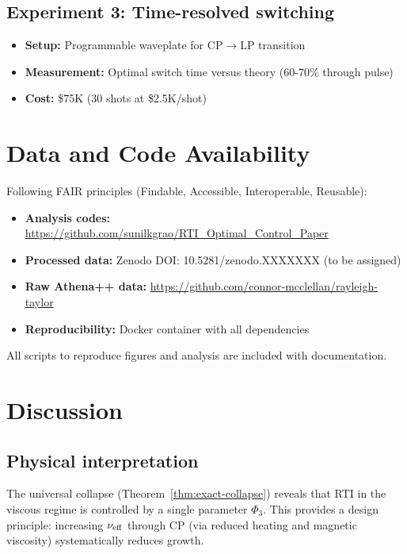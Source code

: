 \documentclass[aps,pre,twocolumn,showpacs,superscriptaddress]{revtex4-2}
\theoremstyle{definition}
\begin{document}
\subsection{Experiment 3: Time-resolved switching}
\begin{itemize}
\item \textbf{Setup:} Programmable waveplate for CP$\to$LP transition
\item \textbf{Measurement:} Optimal switch time versus theory (60-70\% through pulse)
\item \textbf{Cost:} \$75K (30 shots at \$2.5K/shot)
\end{itemize}

\section{Data and Code Availability}\label{sec:data}

Following FAIR principles (Findable, Accessible, Interoperable, Reusable):

\begin{itemize}
\item \textbf{Analysis codes:} \url{https://github.com/sunilkgrao/RTI_Optimal_Control_Paper}
\item \textbf{Processed data:} Zenodo DOI: 10.5281/zenodo.XXXXXXX (to be assigned)
\item \textbf{Raw Athena++ data:} \url{https://github.com/connor-mcclellan/rayleigh-taylor}
\item \textbf{Reproducibility:} Docker container with all dependencies
\end{itemize}

All scripts to reproduce figures and analysis are included with documentation.

\section{Discussion}\label{sec:discussion}

\subsection{Physical interpretation}

The universal collapse (Theorem~\ref{thm:exact-collapse}) reveals that RTI in the viscous regime is controlled by a single parameter $\Phi_3$. This provides a design principle: increasing $\nu_{\rm eff}$ through CP (via reduced heating and magnetic viscosity) systematically reduces growth.
\end{document}
